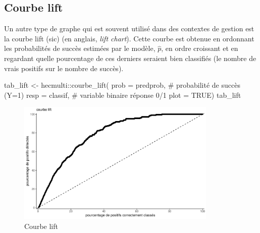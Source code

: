\documentclass[
  11pt,
  letterpaper,
]{scrbook}
\newenvironment{Shaded}{\begin{snugshade}}{\end{snugshade}}
\newcommand{\AttributeTok}[1]{\textcolor[rgb]{0.40,0.45,0.13}{#1}}
\newcommand{\CommentTok}[1]{\textcolor[rgb]{0.37,0.37,0.37}{#1}}
\newcommand{\ConstantTok}[1]{\textcolor[rgb]{0.56,0.35,0.01}{#1}}
\newcommand{\FunctionTok}[1]{\textcolor[rgb]{0.28,0.35,0.67}{#1}}
\newcommand{\NormalTok}[1]{\textcolor[rgb]{0.00,0.23,0.31}{#1}}
\newcommand{\OtherTok}[1]{\textcolor[rgb]{0.00,0.23,0.31}{#1}}
\newcommand{\SpecialCharTok}[1]{\textcolor[rgb]{0.37,0.37,0.37}{#1}}
\theoremstyle{definition}
\theoremstyle{remark}
\begin{document}
\hypertarget{courbe-lift}{%
\subsection{Courbe lift}\label{courbe-lift}}

Un autre type de graphe qui est souvent utilisé dans des contextes de
gestion est la courbe lift (sic) (en anglais, \emph{lift chart}). Cette
courbe est obtenue en ordonnant les probabilités de succès estimées par
le modèle, \(\widehat{p}\), en ordre croissant et en regardant quelle
pourcentage de ces derniers seraient bien classifiés (le nombre de vrais
positifs sur le nombre de succès).

\begin{Shaded}
\begin{Highlighting}[]
\NormalTok{tab\_lift }\OtherTok{\textless{}{-}}\NormalTok{ hecmulti}\SpecialCharTok{::}\FunctionTok{courbe\_lift}\NormalTok{(}
  \AttributeTok{prob =}\NormalTok{ predprob, }\CommentTok{\# probabilité de succès (Y=1)}
  \AttributeTok{resp =}\NormalTok{ classif, }\CommentTok{\# variable binaire réponse 0/1}
  \AttributeTok{plot =} \ConstantTok{TRUE}\NormalTok{)}
\NormalTok{tab\_lift}
\end{Highlighting}
\end{Shaded}

\begin{figure}[ht!]

{\centering \includegraphics[width=0.85\textwidth,height=\textheight]{reglogistique_files/figure-pdf/fig-lift-1.pdf}

}

\caption{\label{fig-lift}Courbe lift}

\end{figure}
\end{document}
